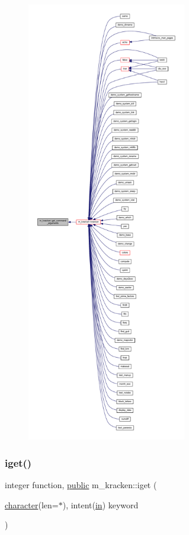 \begin{figure}[H]
\begin{center}
\leavevmode
\includegraphics[height=550pt]{namespacem__kracken_a4c509f8594be3b73928c43c961c1caf4_icgraph}
\end{center}
\end{figure}
\mbox{\label{namespacem__kracken_a420718890eac378e5cd047dd0b477424}} 
\subsubsection{\texorpdfstring{iget()}{iget()}}
{\footnotesize\ttfamily integer function, \hyperlink{M__stopwatch_83_8txt_a2f74811300c361e53b430611a7d1769f}{public} m\+\_\+kracken\+::iget (\begin{DoxyParamCaption}\item[{\hyperlink{option__stopwatch_83_8txt_abd4b21fbbd175834027b5224bfe97e66}{character}(len=$\ast$), intent(\hyperlink{M__journal_83_8txt_afce72651d1eed785a2132bee863b2f38}{in})}]{keyword }\end{DoxyParamCaption})}



